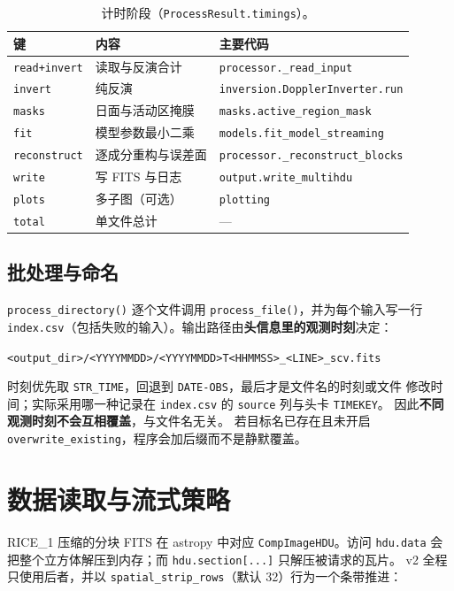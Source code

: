 \documentclass[11pt,a4paper]{ctexart}
\newcommand{\code}[1]{\texttt{\small #1}}
\begin{document}
\begin{table}[htbp]
\centering
\small
\caption{计时阶段（\code{ProcessResult.timings}）。}
\label{tab:stages}
\begin{tabular}{lll}
\toprule
键 & 内容 & 主要代码 \\
\midrule
\code{read+invert}   & 读取与反演合计 & \code{processor.\_read\_input} \\
\code{invert}        & 纯反演 & \code{inversion.DopplerInverter.run} \\
\code{masks}         & 日面与活动区掩膜 & \code{masks.active\_region\_mask} \\
\code{fit}           & 模型参数最小二乘 & \code{models.fit\_model\_streaming} \\
\code{reconstruct}   & 逐成分重构与误差面 & \code{processor.\_reconstruct\_blocks} \\
\code{write}         & 写 FITS 与日志 & \code{output.write\_multihdu} \\
\code{plots}         & 多子图（可选） & \code{plotting} \\
\code{total}         & 单文件总计 & --- \\
\bottomrule
\end{tabular}
\end{table}

\subsection{批处理与命名}
\code{process\_directory()} 逐个文件调用 \code{process\_file()}，并为每个输入写一行
\code{index.csv}（包括失败的输入）。输出路径由\textbf{头信息里的观测时刻}决定：
\begin{center}
\code{<output\_dir>/<YYYYMMDD>/<YYYYMMDD>T<HHMMSS>\_<LINE>\_scv.fits}
\end{center}
时刻优先取 \code{STR\_TIME}，回退到 \code{DATE-OBS}，最后才是文件名的时刻或文件
修改时间；实际采用哪一种记录在 \code{index.csv} 的 \code{source} 列与头卡 \code{TIMEKEY}。
因此\textbf{不同观测时刻不会互相覆盖}，与文件名无关。
若目标名已存在且未开启 \code{overwrite\_existing}，程序会加后缀而不是静默覆盖。

\section{数据读取与流式策略}

RICE\_1 压缩的分块 FITS 在 astropy 中对应 \code{CompImageHDU}。访问 \code{hdu.data}
会把整个立方体解压到内存；而 \code{hdu.section[...]} 只解压被请求的瓦片。
v2 全程只使用后者，并以 \code{spatial\_strip\_rows}（默认 32）行为一个条带推进：
\end{document}
